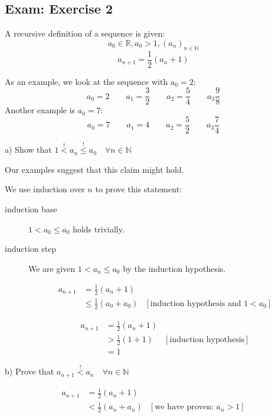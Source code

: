 \documentclass[a4paper]{article}
\theoremstyle{definition}
\begin{document}
\subsection{Exam: Exercise 2}
\begin{ex}
  A recursive definition of a sequence is given:
  \[ a_0 \in \mathbb R, a_0 > 1, (a_n)_{n\in\mathbb N} \]
  \[ a_{n+1} = \frac12 \left(a_n +  1\right) \]
\end{ex}

As an example, we look at the sequence with $a_0 = 2$:
\[ a_0 = 2 \qquad a_1 = \frac32 \qquad a_2 = \frac54 \qquad a_3 \frac98 \]
Another example is $a_0 = 7$:
\[ a_0 = 7 \qquad a_1 = 4 \qquad a_2 = \frac52 \qquad a_3 \frac74 \]

\begin{ex}
  a) Show that $1 \stackrel!< a_n \stackrel!{\leq} a_0 \quad \forall n \in \mathbb N$
\end{ex}

Our examples suggest that this claim might hold.

We use induction over $n$ to prove this statement:
\begin{description}
  \item[induction base] $1 < a_0 \leq a_0$ holds trivially.
  \item[induction step]
    We are given $1 < a_n \leq a_0$ by the induction hypothesis.

    \begin{align*}
      a_{n+1} &= \frac12 (a_n + 1) \\
              &\leq \frac12 (a_0 + a_0) &[\text{induction hypothesis and } 1 < a_0]
    \end{align*}

    \begin{align*}
      a_{n+1} &= \frac12 (a_n + 1) \\
              &> \frac12 (1 + 1) & [\text{induction hypothesis}] \\
              &= 1
    \end{align*}
\end{description}

\begin{ex}
  b) Prove that $a_{n+1} \stackrel{!}{<} a_n \quad \forall n \in \mathbb N$
\end{ex}

\begin{align*}
  a_{n+1} &= \frac12 (a_n + 1) \\
          &< \frac12 (a_n + a_n)   &[\text{we have proven: } a_n > 1]
\end{align*}
\end{document}
